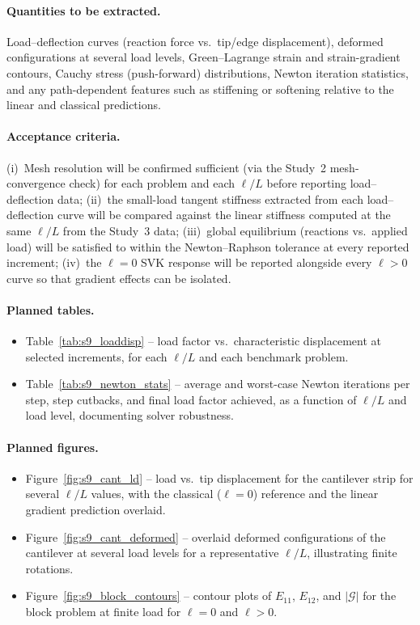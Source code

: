 \documentclass[11pt]{article}
\begin{document}
\paragraph{Quantities to be extracted.}
Load--deflection curves (reaction force vs.\ tip/edge
displacement), deformed configurations at several load
levels, Green--Lagrange strain and strain-gradient contours,
Cauchy stress (push-forward) distributions, Newton iteration
statistics, and any path-dependent features such as stiffening
or softening relative to the linear and classical predictions.

\paragraph{Acceptance criteria.}
(i)~Mesh resolution will be confirmed sufficient (via the
Study~2 mesh-convergence check) for each problem and each
$\ell/L$ before reporting load--deflection data; (ii)~the
small-load tangent stiffness extracted from each
load--deflection curve will be compared against the linear
stiffness computed at the same $\ell/L$ from the Study~3
data; (iii)~global equilibrium (reactions vs.\ applied load)
will be satisfied to within the Newton--Raphson tolerance at
every reported increment; (iv)~the $\ell=0$ SVK response
will be reported alongside every $\ell>0$ curve so that
gradient effects can be isolated.

\paragraph{Planned tables.}
\begin{itemize}
  \item Table~\ref{tab:s9_loaddisp} -- load factor vs.\
    characteristic displacement at selected increments, for
    each $\ell/L$ and each benchmark problem.
  \item Table~\ref{tab:s9_newton_stats} -- average and
    worst-case Newton iterations per step, step cutbacks,
    and final load factor achieved, as a function of
    $\ell/L$ and load level, documenting solver robustness.
\end{itemize}

\paragraph{Planned figures.}
\begin{itemize}
  \item Figure~\ref{fig:s9_cant_ld} -- load vs.\ tip
    displacement for the cantilever strip for several $\ell/L$
    values, with the classical ($\ell=0$) reference and the
    linear gradient prediction overlaid.
  \item Figure~\ref{fig:s9_cant_deformed} -- overlaid deformed
    configurations of the cantilever at several load levels
    for a representative $\ell/L$, illustrating finite
    rotations.
  \item Figure~\ref{fig:s9_block_contours} -- contour plots of
    $E_{11}$, $E_{12}$, and $|\bm{\mathcal{G}}|$ for the
    block problem at finite load for $\ell=0$ and $\ell>0$.
\end{itemize}
\end{document}
